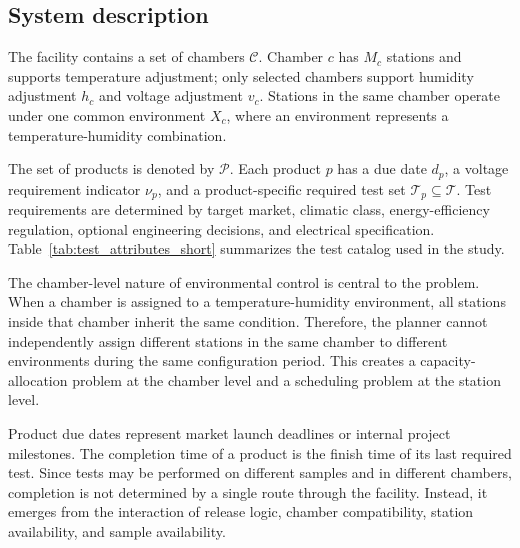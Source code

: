 \documentclass[11pt]{article}
\begin{document}
\subsection{System description}
\label{subsec:system}

The facility contains a set of chambers \(\mathcal{C}\). Chamber \(c\) has \(M_c\) stations and supports temperature adjustment; only selected chambers support humidity adjustment \(h_c\) and voltage adjustment \(v_c\). Stations in the same chamber operate under one common environment \(X_c\), where an environment represents a temperature-humidity combination.

The set of products is denoted by \(\mathcal{P}\). Each product \(p\) has a due date \(d_p\), a voltage requirement indicator \(\nu_p\), and a product-specific required test set \(\mathcal{T}_p \subseteq \mathcal{T}\). Test requirements are determined by target market, climatic class, energy-efficiency regulation, optional engineering decisions, and electrical specification. Table~\ref{tab:test_attributes_short} summarizes the test catalog used in the study.

The chamber-level nature of environmental control is central to the problem. When a chamber is assigned to a temperature-humidity environment, all stations inside that chamber inherit the same condition. Therefore, the planner cannot independently assign different stations in the same chamber to different environments during the same configuration period. This creates a capacity-allocation problem at the chamber level and a scheduling problem at the station level.

Product due dates represent market launch deadlines or internal project milestones. The completion time of a product is the finish time of its last required test. Since tests may be performed on different samples and in different chambers, completion is not determined by a single route through the facility. Instead, it emerges from the interaction of release logic, chamber compatibility, station availability, and sample availability.
\end{document}
